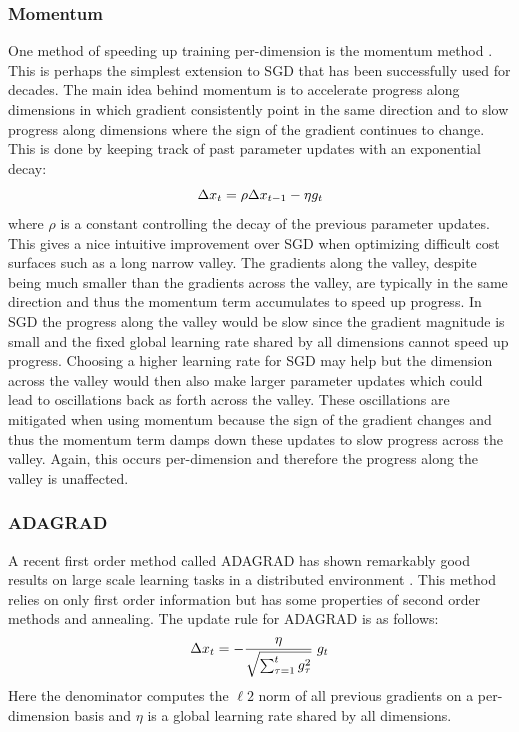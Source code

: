 \documentclass{article}
\def\BE{\vspace{-2.0mm}\begin{equation}}
\def\EE{\vspace{-1.4mm}\end{equation}}
\begin{document}
\subsubsection{Momentum}
One method of speeding up training per-dimension is the momentum method \cite{autoencoder-nn}. This
is perhaps
the simplest extension to SGD that has been successfully used for decades. The main idea behind
momentum is to accelerate progress along dimensions in which gradient consistently point in the same
direction and to slow progress along dimensions where the sign of the gradient continues to
change. This is done by keeping track of past parameter updates with an exponential decay:
\BE
\Delta x_t = \rho \Delta x_{t-1} - \eta g_t
\EE
where $\rho$ is a constant controlling the decay of the previous parameter updates. This gives a
nice intuitive improvement over SGD when optimizing difficult cost surfaces such as a long narrow
valley. The gradients along the valley, despite being much smaller than the gradients across the
valley, are typically in the same direction and thus the momentum term accumulates to speed up
progress. In SGD the progress along the valley would be slow since the gradient
magnitude is small and the fixed global learning rate shared by all dimensions cannot speed up
progress. Choosing a higher learning rate for SGD may help but the dimension across the valley
would then also make larger parameter updates which could lead to oscillations back as forth across
the valley. These oscillations are mitigated when using momentum because the sign of the gradient
changes and thus the momentum term damps down these updates to slow progress across the
valley. Again, this occurs per-dimension and therefore the progress along the valley is unaffected.

\subsubsection{ADAGRAD}
A recent first order method called ADAGRAD \cite{adagrad} has shown remarkably good results on large
scale learning tasks in a distributed environment \cite{gbrain-nips12}.
This method relies on only first order information but has some properties of second order
methods and annealing. The update rule for ADAGRAD is as follows:
\BE
\Delta x_t = -  \frac{\eta}{\sqrt{\sum_{\tau=1}^t g_{\tau}^2}} \; g_t
\label{eqn:ADAGRAD}
\EE
Here the denominator computes the $\ell2$ norm of all previous gradients on a per-dimension basis
and $\eta$ is a global learning rate shared by all dimensions.
\end{document}
